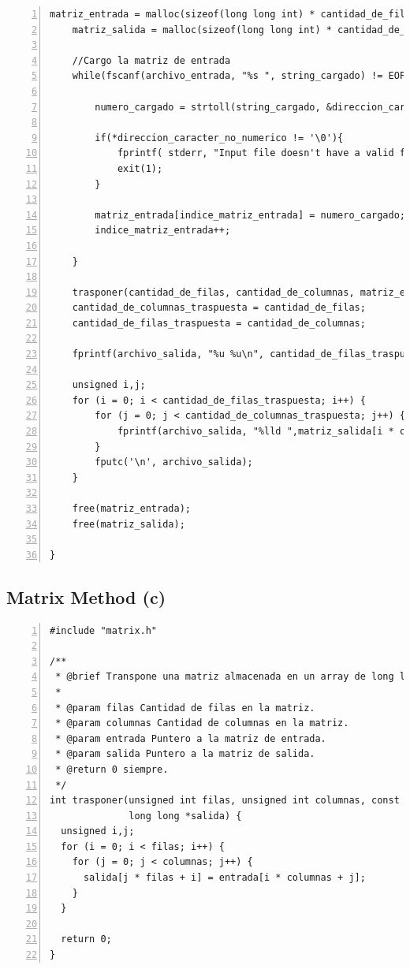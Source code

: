 \documentclass[11pt,a4paper]{article}
\begin{document}
\begin{lstlisting}[numbers=left, tabsize=2, basicstyle=\fontsize{11}{13}\ttfamily, frame=single, caption={makefile}]
    matriz_entrada = malloc(sizeof(long long int) * cantidad_de_filas * cantidad_de_columnas);
    matriz_salida = malloc(sizeof(long long int) * cantidad_de_filas * cantidad_de_columnas);
    
    //Cargo la matriz de entrada
    while(fscanf(archivo_entrada, "%s ", string_cargado) != EOF){
        
        numero_cargado = strtoll(string_cargado, &direccion_caracter_no_numerico, 0); //Esta en base 10;
        
        if(*direccion_caracter_no_numerico != '\0'){
            fprintf( stderr, "Input file doesn't have a valid format\n"); 
            exit(1);
        }
        
        matriz_entrada[indice_matriz_entrada] = numero_cargado;
        indice_matriz_entrada++;
        
    }
    
    trasponer(cantidad_de_filas, cantidad_de_columnas, matriz_entrada, matriz_salida);
    cantidad_de_columnas_traspuesta = cantidad_de_filas;
    cantidad_de_filas_traspuesta = cantidad_de_columnas;
    
    fprintf(archivo_salida, "%u %u\n", cantidad_de_filas_traspuesta, cantidad_de_columnas_traspuesta );
    
    unsigned i,j;
    for (i = 0; i < cantidad_de_filas_traspuesta; i++) {
        for (j = 0; j < cantidad_de_columnas_traspuesta; j++) {
            fprintf(archivo_salida, "%lld ",matriz_salida[i * cantidad_de_columnas_traspuesta + j]);
        } 
        fputc('\n', archivo_salida);
    }
    
    free(matriz_entrada);
    free(matriz_salida);
    
}

\end{lstlisting}


\subsection{Matrix Method (c)}

\begin{lstlisting}[numbers=left, tabsize=2, basicstyle=\fontsize{11}{13}\ttfamily, frame=single, caption={Matrix method (c)}]
#include "matrix.h"

/**
 * @brief Transpone una matriz almacenada en un array de long long.
 *
 * @param filas Cantidad de filas en la matriz.
 * @param columnas Cantidad de columnas en la matriz.
 * @param entrada Puntero a la matriz de entrada.
 * @param salida Puntero a la matriz de salida.
 * @return 0 siempre.
 */
int trasponer(unsigned int filas, unsigned int columnas, const long long *entrada,
              long long *salida) {
  unsigned i,j;
  for (i = 0; i < filas; i++) {
    for (j = 0; j < columnas; j++) {
      salida[j * filas + i] = entrada[i * columnas + j];
    }
  }

  return 0;
}
\end{lstlisting}
\end{document}
